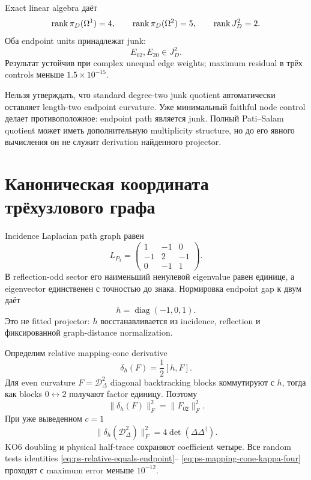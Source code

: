 Exact linear algebra даёт
\begin{equation}
 \operatorname{rank}\pi_D(\Omega^1)=4,
 \qquad
 \operatorname{rank}\pi_D(\Omega^2)=5,
 \qquad
 \operatorname{rank} J_D^2=2.
\end{equation}
Оба endpoint units принадлежат junk:
\begin{equation}
 E_{02},E_{20}\in J_D^2.
 \label{eq:ps-endpoint-in-junk}
\end{equation}
Результат устойчив при complex unequal edge weights; maximum residual в
трёх controls меньше \(1.5\times10^{-15}\).

\begin{nogocriterion}
Нельзя утверждать, что standard degree-two junk quotient автоматически
оставляет length-two endpoint curvature. Уже минимальный faithful node
control делает противоположное: endpoint path является junk. Полный
Pati--Salam quotient может иметь дополнительную multiplicity structure, но
до его явного вычисления он не служит derivation найденного projector.
\end{nogocriterion}

\section{Каноническая координата трёхузлового графа}

Incidence Laplacian path graph равен
\begin{equation}
 L_{P_3}=
 \begin{pmatrix}
 1&-1&0\\
 -1&2&-1\\
 0&-1&1
 \end{pmatrix}.
\end{equation}
В reflection-odd sector его наименьший ненулевой eigenvalue равен единице, а
eigenvector единственен с точностью до знака. Нормировка endpoint gap к двум
даёт
\begin{equation}
 h=\operatorname{diag}(-1,0,1).
 \label{eq:ps-canonical-graph-height}
\end{equation}
Это не fitted projector: \(h\) восстанавливается из incidence, reflection и
фиксированной graph-distance normalization.

Определим relative mapping-cone derivative
\begin{equation}
 \delta_h(F)=\frac12[h,F].
 \label{eq:ps-mapping-cone-derivative}
\end{equation}
Для even curvature \(F=\mathcal D_\Delta^2\) diagonal backtracking blocks
коммутируют с \(h\), тогда как blocks \(0\leftrightarrow2\) получают factor
единицу. Поэтому
\begin{equation}
 \|\delta_h(F)\|_F^2=\|F_{02}\|_F^2.
 \label{eq:ps-relative-equals-endpoint}
\end{equation}
При уже выведенном \(c=1\)
\begin{equation}
 \boxed{
 \|\delta_h(\mathcal D_\Delta^2)\|_F^2
 =4\det(\Delta\Delta^\dagger).}
 \label{eq:ps-mapping-cone-kappa-four}
\end{equation}
KO6 doubling и physical half-trace сохраняют coefficient четыре. Все random
tests identities \eqref{eq:ps-relative-equals-endpoint}--
\eqref{eq:ps-mapping-cone-kappa-four} проходят с maximum error меньше
\(10^{-12}\).

